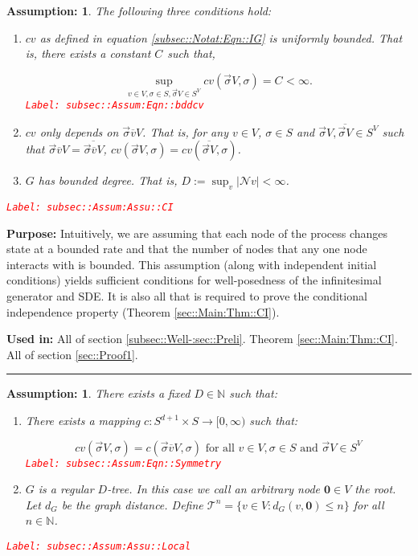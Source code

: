 \documentclass[12pt]{article}
\newcommand{\mb}{\mathbb}
\newcommand{\mc}{\mathcal}
\newcommand{\ra}{\rightarrow}
\newcommand{\ov}{\overline}
\newcommand{\te}{\text}
\newcommand{\tr}{\textcolor{red}}
\newcommand{\labe}[1]{\tr{\texttt{Label: #1}}}
\newcommand{\purpose}{\textbf{Purpose: }}
\newcommand{\usein}{\textbf{Used in: }}
\newcommand{\lin}{\rule{\linewidth}{0.4 pt}}
\newcommand{\defeq}{:=}								%
\newcommand{\neigh}{\mc{N}}					%
\renewcommand{\root}{\mathbf{0}}				%
\renewcommand{\v}{v}							%
\renewcommand{\S}{S}							%
\newcommand{\s}{\sigma}							%
\newcommand{\sv}{\vec{\s}}						%
\newcommand{\IGr}{c}							%
\newcommand{\cl}{\ov}							%
\newcommand{\degr}{D}								%
\newcommand{\tree}{\mc{T}}							%
\renewcommand{\G}{G}								%
\newcommand{\V}{V}									%
\newcommand{\numb}{n}								%
\newcommand{\XState}[1]{\S^{#1}}				%
\newcommand{\gdist}{d_G}							%
\newcommand{\const}[1]{C_{#1}}						%
\newtheorem{assu}[thms]{Assumption: }
\begin{document}
\begin{assu}
The following three conditions hold:
\begin{enumerate}
\item \(\IGr{\v}\) as defined in equation \eqref{subsec::Notat:Eqn::IG} is uniformly bounded. That is, there exists a constant \(\const{}\) such that,

\begin{equation}
\sup_{\v\in \V,\s \in \S,\sv{}{\V}\in \S^\V} \IGr{\v}(\sv{}{\V},\s) = \const{} < \infty.
\label{subsec::Assum:Eqn::bddcv}
\end{equation}
\labe{subsec::Assum:Eqn::bddcv}

\item \(\IGr{\v}\) only depends on \(\sv{\cl{\v}}{\V}\). That is, for any \(\v\in \V\), \(\s\in \S\) and \(\sv{}{\V},\ov{\sv{}{\V}} \in \S^\V\) such that \(\sv{\cl{\v}}{\V} = \ov{\sv{\cl{\v}}{\V}}\), \(\IGr{\v}(\sv{}{\V},\s) = \IGr{\v}(\ov{\sv{}{\V}},\s)\).

\item \(\G\) has bounded degree. That is, \(\degr \defeq \sup_\v |\neigh{\v}| < \infty\).
\end{enumerate}
\label{subsec::Assum:Assu::CI}\labe{subsec::Assum:Assu::CI}
\end{assu}

\purpose Intuitively, we are assuming that each node of the process changes state at a bounded rate and that the number of nodes that any one node interacts with is bounded. This assumption (along with independent initial conditions) yields sufficient conditions for well-posedness of the infinitesimal generator and SDE. It is also all that is required to prove the conditional independence property (Theorem \ref{sec::Main:Thm::CI}). 

\usein All of section \ref{subsec::Well-:sec::Preli}. Theorem \ref{sec::Main:Thm::CI}. All of section \ref{sec::Proof1}.

\lin

\begin{assu}
There exists a fixed \(\degr\in \mb{N}\) such that:

\begin{enumerate}
\item There exists a mapping \(\IGr{}: \S^{d+1} \times \S \ra [0,\infty)\) such that:

\begin{equation}
\IGr{\v}(\sv{}{\V},\s) = \IGr{}(\sv{\cl{\v}}{\V},\s) \te{ for all } \v\in \V, \s\in \S\te{ and } \sv{}{\V} \in \S^\V
\label{subsec::Assum:Eqn::Symmetry}
\end{equation}
\labe{subsec::Assum:Eqn::Symmetry}

\item \(\G\) is a regular \(\degr\)-tree. In this case we call an arbitrary node \(\root\in \V\) the root. Let \(\gdist\) be the graph distance. Define \(\tree^\numb = \{\v \in \V: \gdist(\v,\root) \leq \numb\}\) for all \(\numb\in \mb{N}\).
\end{enumerate}
\label{subsec::Assum:Assu::Local}\labe{subsec::Assum:Assu::Local}
\end{assu}
\end{document}
